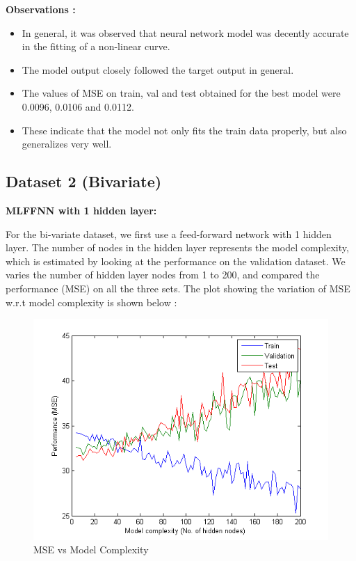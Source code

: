 \textbf{Observations :}

\begin{itemize}
\item In general, it was observed that neural network model was decently accurate in the fitting of a non-linear curve. 
\item The model output closely followed the target output in general. 
\item The values of MSE on train, val and test obtained for the best model were 0.0096, 0.0106 and 0.0112. \item These indicate that the model not only fits the train data properly, but also generalizes very well.
\end{itemize}



\subsection{Dataset 2 (Bivariate)}

\textbf{MLFFNN with 1 hidden layer:}

\begin{flushleft}
For the bi-variate dataset, we first use a feed-forward network with 1 hidden layer. The number of nodes in the hidden layer represents the model complexity, which is estimated by looking at the performance on the validation dataset. We varies the number of hidden layer nodes from 1 to 200, and compared the performance (MSE) on all the three sets. The plot showing the variation of MSE w.r.t model complexity is shown below :

\end{flushleft}


\begin{figure}[H]
\centering
\includegraphics[width=0.8\linewidth]{Regression/bivariate/1layer_mse.png}
\caption{MSE vs Model Complexity}
\end{figure}

